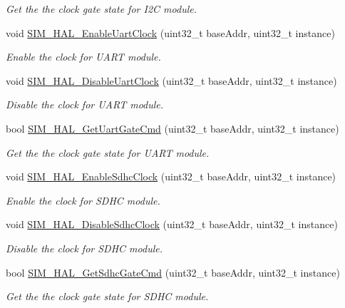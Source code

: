 \begin{DoxyCompactItemize}
\begin{DoxyCompactList}\small\item\em Get the the clock gate state for I2C module. \end{DoxyCompactList}\item 
void \hyperlink{group__sim__hal_ga1449b95e874bccb5debd9d8f2f260c96}{S\+I\+M\+\_\+\+H\+A\+L\+\_\+\+Enable\+Uart\+Clock} (uint32\+\_\+t base\+Addr, uint32\+\_\+t instance)
\begin{DoxyCompactList}\small\item\em Enable the clock for U\+A\+RT module. \end{DoxyCompactList}\item 
void \hyperlink{group__sim__hal_ga08c5c55fdeadb397e9a008b5a2fe963b}{S\+I\+M\+\_\+\+H\+A\+L\+\_\+\+Disable\+Uart\+Clock} (uint32\+\_\+t base\+Addr, uint32\+\_\+t instance)
\begin{DoxyCompactList}\small\item\em Disable the clock for U\+A\+RT module. \end{DoxyCompactList}\item 
bool \hyperlink{group__sim__hal_ga5d1d5f588e307823c307e3107c1ae4a6}{S\+I\+M\+\_\+\+H\+A\+L\+\_\+\+Get\+Uart\+Gate\+Cmd} (uint32\+\_\+t base\+Addr, uint32\+\_\+t instance)
\begin{DoxyCompactList}\small\item\em Get the the clock gate state for U\+A\+RT module. \end{DoxyCompactList}\item 
void \hyperlink{group__sim__hal_gae264a18c0aac38c25563b4606b71ceb2}{S\+I\+M\+\_\+\+H\+A\+L\+\_\+\+Enable\+Sdhc\+Clock} (uint32\+\_\+t base\+Addr, uint32\+\_\+t instance)
\begin{DoxyCompactList}\small\item\em Enable the clock for S\+D\+HC module. \end{DoxyCompactList}\item 
void \hyperlink{group__sim__hal_gaa750050b55b4d9973f639e8bb422f67d}{S\+I\+M\+\_\+\+H\+A\+L\+\_\+\+Disable\+Sdhc\+Clock} (uint32\+\_\+t base\+Addr, uint32\+\_\+t instance)
\begin{DoxyCompactList}\small\item\em Disable the clock for S\+D\+HC module. \end{DoxyCompactList}\item 
bool \hyperlink{group__sim__hal_gadeaa7b00f4e0684a51234e77c4331494}{S\+I\+M\+\_\+\+H\+A\+L\+\_\+\+Get\+Sdhc\+Gate\+Cmd} (uint32\+\_\+t base\+Addr, uint32\+\_\+t instance)
\begin{DoxyCompactList}\small\item\em Get the the clock gate state for S\+D\+HC module. \end{DoxyCompactList}\end{DoxyCompactItemize}


